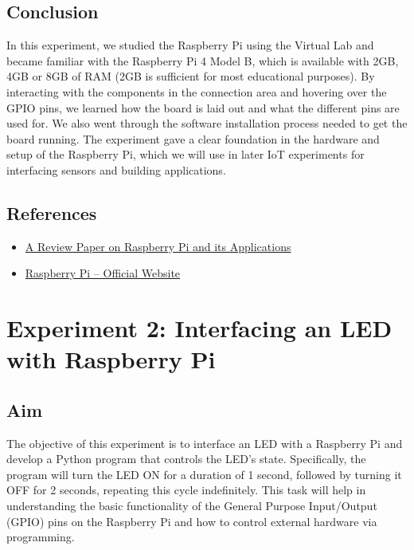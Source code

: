 \documentclass[12pt]{article}
\begin{document}
\subsection*{Conclusion}
In this experiment, we studied the Raspberry Pi using the Virtual Lab and became familiar with the Raspberry Pi 4 Model B, which is available with 2GB, 4GB or 8GB of RAM (2GB is sufficient for most educational purposes). By interacting with the components in the connection area and hovering over the GPIO pins, we learned how the board is laid out and what the different pins are used for. We also went through the software installation process needed to get the board running. The experiment gave a clear foundation in the hardware and setup of the Raspberry Pi, which we will use in later IoT experiments for interfacing sensors and building applications.

\subsection*{References}
\begin{itemize}
\item \href{https://www.researchgate.net/publication/348993428_A_Review_Paper_on_Raspberry_Pi_and_its_Applications}{A Review Paper on Raspberry Pi and its Applications}
\item \href{https://www.raspberrypi.org/}{Raspberry Pi – Official Website}
\end{itemize}

\newpage


\section{Experiment 2: Interfacing an LED with Raspberry Pi}

\subsection*{Aim}
The objective of this experiment is to interface an LED with a Raspberry Pi and develop a Python program that controls the LED's state. Specifically, the program will turn the LED ON for a duration of 1 second, followed by turning it OFF for 2 seconds, repeating this cycle indefinitely. This task will help in understanding the basic functionality of the General Purpose Input/Output (GPIO) pins on the Raspberry Pi and how to control external hardware via programming.
\end{document}
